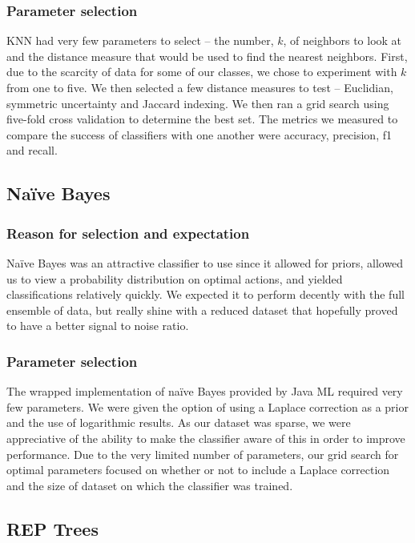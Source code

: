 \documentclass[]{article}   %
\begin{document}
\subsubsection{Parameter selection}
KNN had very few parameters to select – the number, $k$, of neighbors to look at and the distance measure that would be used to find the nearest neighbors. First, due to the scarcity of data for some of our classes, we chose to experiment with $k$ from one to five. We then selected a few distance measures to test – Euclidian, symmetric uncertainty and Jaccard indexing. We then ran a grid search using five-fold cross validation to determine the best set. The metrics we measured to compare the success of classifiers with one another were accuracy, precision, f1 and recall. 


\subsection{Na\"{i}ve Bayes}
\subsubsection{Reason for selection and expectation}
Na\"{i}ve Bayes was an attractive classifier to use since it allowed for priors, allowed us to view a probability distribution on optimal actions, and yielded classifications relatively quickly. We expected it to perform decently with the full ensemble of data, but really shine with a reduced dataset that hopefully proved to have a better signal to noise ratio. 

\subsubsection{Parameter selection}
The wrapped implementation of na\"{i}ve Bayes provided by Java ML required very few parameters. We were given the option of using a Laplace correction as a prior and the use of logarithmic results. As our dataset was sparse, we were appreciative of the ability to make the classifier aware of this in order to improve performance. Due to the very limited number of parameters, our grid search for optimal parameters focused on whether or not to include a Laplace correction and the size of dataset on which the classifier was trained. 

\subsection{REP Trees}
\end{document}
